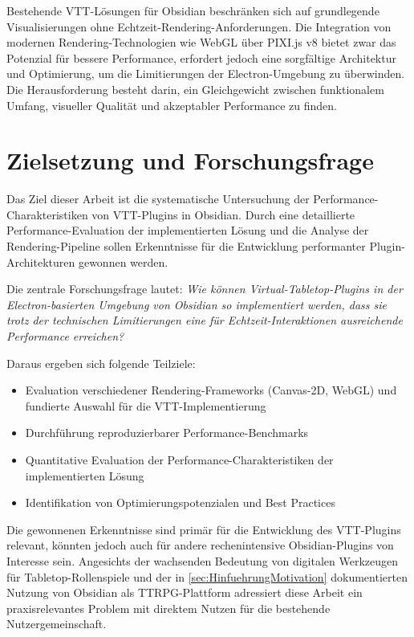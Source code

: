 Bestehende \ac{VTT}-Lösungen für Obsidian beschränken sich auf grundlegende Visualisierungen ohne Echtzeit-Rendering-Anforderungen. Die Integration von modernen Rendering-Technologien wie \ac{WebGL} über PIXI.js v8 bietet zwar das Potenzial für bessere Performance, erfordert jedoch eine sorgfältige Architektur und Optimierung, um die Limitierungen der Electron-Umgebung zu überwinden. Die Herausforderung besteht darin, ein Gleichgewicht zwischen funktionalem Umfang, visueller Qualität und akzeptabler Performance zu finden.

\section{Zielsetzung und Forschungsfrage}
\label{sec:ZielsetzungForschungsfrage}

Das Ziel dieser Arbeit ist die systematische Untersuchung der Performance-Charakteristiken von \ac{VTT}-Plugins in Obsidian. Durch eine detaillierte Performance-Evaluation der implementierten Lösung und die Analyse der Rendering-Pipeline sollen Erkenntnisse für die Entwicklung performanter Plugin-Architekturen gewonnen werden.

Die zentrale Forschungsfrage lautet: \textit{Wie können Virtual-Tabletop-Plugins in der Electron-basierten Umgebung von Obsidian so implementiert werden, dass sie trotz der technischen Limitierungen eine für Echtzeit-Interaktionen ausreichende Performance erreichen?}

Daraus ergeben sich folgende Teilziele:
\begin{itemize}
	\item Evaluation verschiedener Rendering-Frameworks (Canvas-2D, \ac{WebGL}) und fundierte Auswahl für die \ac{VTT}-Implementierung
	\item Durchführung reproduzierbarer Performance-Benchmarks
	\item Quantitative Evaluation der Performance-Charakteristiken der implementierten Lösung
	\item Identifikation von Optimierungspotenzialen und Best Practices
\end{itemize}

Die gewonnenen Erkenntnisse sind primär für die Entwicklung des \ac{VTT}-Plugins relevant, könnten jedoch auch für andere rechenintensive Obsidian-Plugins von Interesse sein. Angesichts der wachsenden Bedeutung von digitalen Werkzeugen für Tabletop-Rollenspiele und der in \autoref{sec:HinfuehrungMotivation} dokumentierten Nutzung von Obsidian als \ac{TTRPG}-Plattform adressiert diese Arbeit ein praxisrelevantes Problem mit direktem Nutzen für die bestehende Nutzergemeinschaft.

